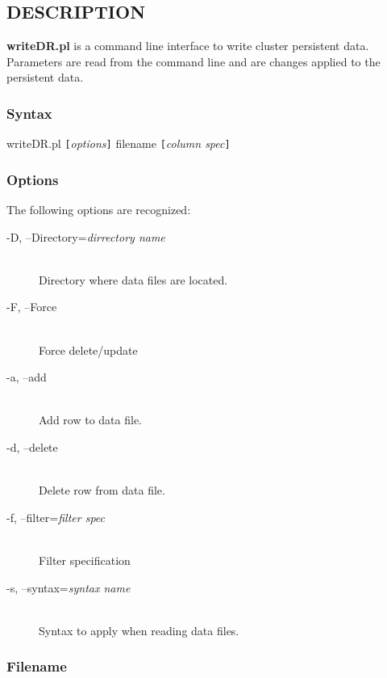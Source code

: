 \subsection*{DESCRIPTION}
{\bf writeDR.pl} is a command line interface to write cluster persistent data.
Parameters are read from the command line and are changes applied to the
persistent data.

\subsubsection*{Syntax}%

writeDR.pl {\tt [}{\em options\/}{\tt ]} filename {\tt [}{\em column spec\/}{\tt ]}

\subsubsection*{Options}%

The following options are recognized:

\begin{description}

\item[-D, --Directory={\em dirrectory name\/}]%
\hfil\\
Directory where data files are located.

\item[-F, --Force]%
\hfil\\
Force delete/update

\item[-a, --add]%
\hfil\\
Add row to data file.

\item[-d, --delete]%
\hfil\\
Delete row from data file.

\item[-f, --filter={\em filter spec\/}]%
\hfil\\
Filter specification

\item[-s, --syntax={\em syntax name\/}]%
\hfil\\
Syntax to apply when reading data files.

\end{description}

\subsubsection*{Filename}%

